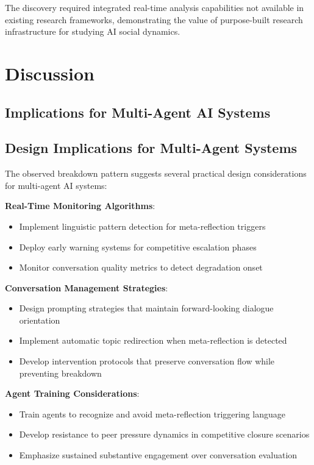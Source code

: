 \documentclass[11pt,letterpaper]{article}
\begin{document}
The discovery required integrated real-time analysis capabilities not available in existing research frameworks, demonstrating the value of purpose-built research infrastructure for studying AI social dynamics.

\section{Discussion}

\subsection{Implications for Multi-Agent AI Systems}

\subsection{Design Implications for Multi-Agent Systems}

The observed breakdown pattern suggests several practical design considerations for multi-agent AI systems:

\textbf{Real-Time Monitoring Algorithms}:
\begin{itemize}
    \item Implement linguistic pattern detection for meta-reflection triggers
    \item Deploy early warning systems for competitive escalation phases
    \item Monitor conversation quality metrics to detect degradation onset
\end{itemize}

\textbf{Conversation Management Strategies}:
\begin{itemize}
    \item Design prompting strategies that maintain forward-looking dialogue orientation
    \item Implement automatic topic redirection when meta-reflection is detected
    \item Develop intervention protocols that preserve conversation flow while preventing breakdown
\end{itemize}

\textbf{Agent Training Considerations}:
\begin{itemize}
    \item Train agents to recognize and avoid meta-reflection triggering language
    \item Develop resistance to peer pressure dynamics in competitive closure scenarios
    \item Emphasize sustained substantive engagement over conversation evaluation
\end{itemize}
\end{document}
